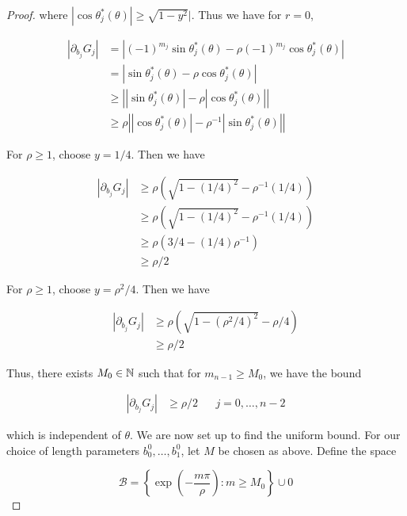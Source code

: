 \documentclass[thesis.tex]{subfiles}
\begin{document}
\begin{theorem}
\begin{proof}
where $|\cos \theta_j^*(\theta)| \geq \sqrt{1 - y^2}|$. Thus we have for $r = 0$,

\begin{align*}
| \partial_{b_j} G_j | 
&= \left| (-1)^{m_j} \sin \theta_j^*(\theta) - \rho (-1)^{m_j} \cos \theta_j^*(\theta) \right| \\
&= \left| \sin \theta_j^*(\theta) - \rho \cos \theta_j^*(\theta) \right| \\
&\geq \left| |\sin \theta_j^*(\theta)| - \rho |\cos \theta_j^*(\theta)| \right| \\
&\geq \rho \left| |\cos \theta_j^*(\theta)| - \rho^{-1} |\sin \theta_j^*(\theta)| \right|
\end{align*}

For $\rho \geq 1$, choose $y = 1/4$. Then we have

\begin{align*}
| \partial_{b_j} G_j | 
&\geq \rho \left( \sqrt{1 - (1/4)^2}  - \rho^{-1}(1/4) \right) \\
&\geq \rho \left( \sqrt{1 - (1/4)^2}  - \rho^{-1}(1/4) \right) \\
&\geq \rho \left( 3/4  - (1/4) \rho^{-1} \right) \\
&\geq \rho/2
\end{align*}

For $\rho \geq 1$, choose $y = \rho^2 / 4$. Then we have

\begin{align*}
| \partial_{b_j} G_j | 
&\geq \rho \left( \sqrt{1 - (\rho^2/4)^2} - \rho/4  \right) \\
&\geq \rho/2
\end{align*}

Thus, there exists $M_0 \in {\mathbb N}$ such that for $m_{n-1} \geq M_0$, we have the bound

\begin{align*}
| \partial_{b_j} G_j | &\geq \rho/2 && j = 0, \dots, n-2
\end{align*}

which is independent of $\theta$. We are now set up to find the uniform bound. For our choice of length parameters $b_0^0, \dots, b_1^0$, let $M$ be chosen as above. Define the space

\begin{equation}
\mathcal{B} = \left\{ \exp\left( -\frac{m \pi}{\rho} \right) : m \geq M_0 \right\} \cup {0}
\end{equation}


\end{proof}
\end{theorem}
\end{document}
